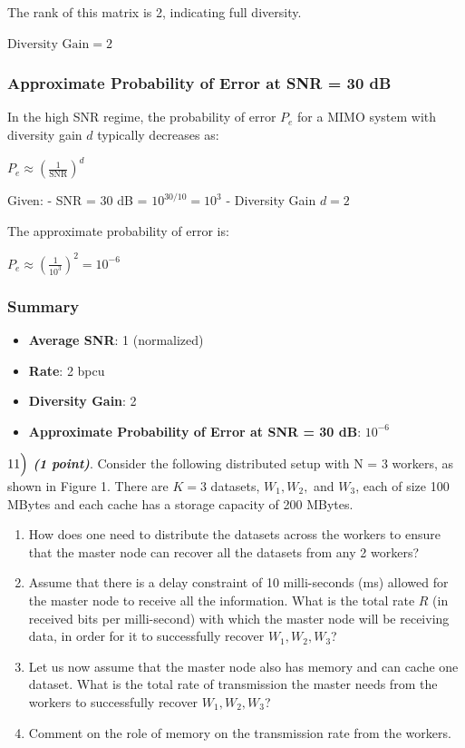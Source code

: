 \documentclass[11pt]{article}
\providecommand{\tightlist}{%
      \setlength{\itemsep}{0pt}\setlength{\parskip}{0pt}}
\begin{document}
The rank of this matrix is 2, indicating full diversity.

\(\text{Diversity Gain} = 2\)

\subsubsection{Approximate Probability of Error at SNR = 30
dB}\label{approximate-probability-of-error-at-snr-30-db}

In the high SNR regime, the probability of error \(P_e\) for a MIMO
system with diversity gain \(d\) typically decreases as:

\(P_e \approx \left( \frac{1}{\text{SNR}} \right)^d\)

Given: - SNR = 30 dB = \(10^{30/10} = 10^3\) - Diversity Gain \(d = 2\)

The approximate probability of error is:

\(P_e \approx \left( \frac{1}{10^3} \right)^2 = 10^{-6}\)

\subsubsection{Summary}\label{summary}

\begin{itemize}
\tightlist
\item
  \textbf{Average SNR}: 1 (normalized)
\item
  \textbf{Rate}: 2 bpcu
\item
  \textbf{Diversity Gain}: 2
\item
  \textbf{Approximate Probability of Error at SNR = 30 dB}: \(10^{-6}\)
\end{itemize}

    \(11\Bigl)\) \textbf{\emph{(1 point)}}. Consider the following
distributed setup with N = 3 workers, as shown in Figure 1. There are
\(K = 3\) datasets, \(W_1, W_2,\) and \(W_3\), each of size 100 MBytes
and each cache has a storage capacity of 200 MBytes.

\begin{enumerate}
\def\labelenumi{\alph{enumi})}
\item
  How does one need to distribute the datasets across the workers to
  ensure that the master node can recover all the datasets from any 2
  workers?
\item
  Assume that there is a delay constraint of 10 milli-seconds (ms)
  allowed for the master node to receive all the information. What is
  the total rate \(R\) (in received bits per milli-second) with which
  the master node will be receiving data, in order for it to
  successfully recover \(W_1, W_2, W_3\)?
\item
  Let us now assume that the master node also has memory and can cache
  one dataset. What is the total rate of transmission the master needs
  from the workers to successfully recover \(W_1, W_2, W_3\)?
\item
  Comment on the role of memory on the transmission rate from the
  workers.
\end{enumerate}
\end{document}
